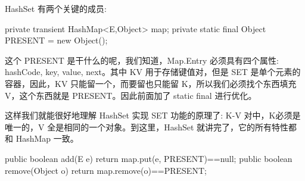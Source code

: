 HashSet 有两个关键的成员:

\begin{Java}
private transient HashMap<E,Object> map;
private static final Object PRESENT = new Object();
\end{Java}

这个 PRESENT 是干什么的呢，我们知道，Map.Entry 必须具有四个属性: hashCode, key, value, next。其中 KV 用于存储键值对，但是 SET 是单个元素的容器，因此，KV 只能留一个，而要留也只能留 K，所以我们必须找个东西填充 V，这个东西就是 PRESENT。因此前面加了 static final 进行优化。

这样我们就能很好地理解 HashSet 实现 SET 功能的原理了: K-V 对中，K必须是唯一的，V 全是相同的一个对象。到这里，HashSet 就讲完了，它的所有特性都和 HashMap 一致。

\begin{Java}
public boolean add(E e) {
    return map.put(e, PRESENT)==null;
}
public boolean remove(Object o) {
    return map.remove(o)==PRESENT;
}
\end{Java}

\newpage